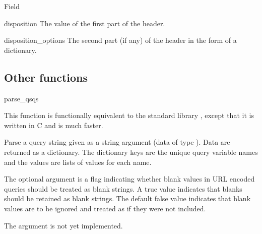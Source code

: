 \begin{classdesc}{Field}{}
  \begin{memberdesc}{disposition}
    The value of the first part of the  header.
  \end{memberdesc}

  \begin{memberdesc}{disposition_options}
    The second part (if any) of the  header in
    the form of a dictionary.
  \end{memberdesc}

  \begin{seealso}
  \end{seealso}
\end{classdesc}

\subsection{Other functions\label{pyapi-util-funcs}}

\begin{funcdesc}{parse_qs}{qs}

  This function is functionally equivalent to the standard library
   , except that it is written in C and is
  much faster. 

  Parse a query string given as a string argument (data of type
  ).  Data are
  returned as a dictionary.  The dictionary keys are the unique query
  variable names and the values are lists of values for each name.

  The optional argument  is a flag indicating
  whether blank values in URL encoded queries should be treated as blank
  strings.  A true value indicates that blanks should be retained as
  blank strings.  The default false value indicates that blank values
  are to be ignored and treated as if they were not included.

  \begin{notice}
    The  argument is not yet implemented.
  \end{notice}

\end{funcdesc}


